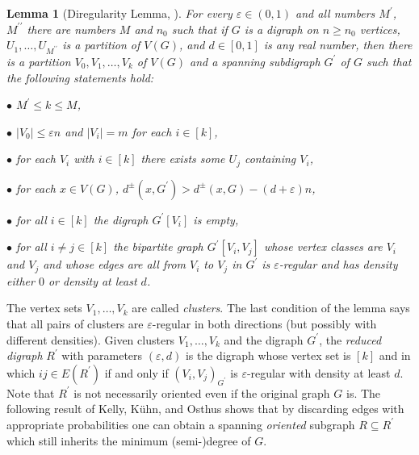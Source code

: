 \documentclass[11pt,a4paper,reqno]{amsart}
\newtheorem{lemma}[theorem]{Lemma}
\theoremstyle{definition} %
\begin{document}
\begin{lemma}[Diregularity Lemma, \cite{keevashJLMS79}]
		\label{LEM:reguler}
		For every $\varepsilon \in (0,1)$ and all numbers $M^{\prime}$, $M^{\prime\prime}$ there are numbers $M$ and $n_0$ such that if $G$ is a digraph on $n \geqslant  n_0$ vertices, $U_1,\ldots,U_{M^{\prime\prime}}$ is a partition of $V(G)$, and $d \in [0,1]$ is any real number, then there is a partition $V_0,V_1,\ldots,V_k$ 
		of $V(G)$ and a spanning subdigraph $G^\prime$ of $G$ such that the following statements hold:
		
		$\bullet$ $M^{\prime}\leqslant  k \leqslant  M$,
		
		$\bullet$ $|V_0| \leqslant  \varepsilon n$ and $|V_i|=m$ for each $i\in[k]$,
		
		$\bullet$ for each $V_i$ with $i\in[k]$ there exists some $U_j$ containing $V_i$,
		
		$\bullet$  for each $x \in V(G)$, $d^\pm(x,G^{\prime}) > d^\pm(x,G) - (d+\varepsilon)n$,
		
		$\bullet$ for all $i\in[k]$ the digraph $G^{\prime}[V_i]$ is empty,
		
		$\bullet$ for all $i\neq j\in[k]$ the bipartite graph $G^{\prime}[V_i,V_j]$ whose vertex classes are $V_i$ and $V_j$ and whose edges are all from $V_i$ to $V_j$ in $G^{\prime}$ is $\varepsilon$-regular and has density either $0$ or density at least $d$.
	\end{lemma}


The vertex sets $V_1,\ldots,V_k$ are called \emph{clusters}. 
The last condition of the lemma says that all pairs of clusters are $\varepsilon$-regular in both directions (but possibly with different densities).
Given clusters $V_1,\ldots,V_k$ and the  digraph $G^{\prime}$, the \emph{reduced digraph} $R^{\prime}$ with parameters $(\varepsilon, d)$ is the digraph
whose vertex set is $[k]$ and in which $ij\in E(R^{\prime})$ if and only if $(V_i, V_j)_{G^{\prime}}$ is $\varepsilon$-regular with density at least $d$.  Note that  $R^{\prime}$ is not necessarily oriented even if the original graph $G$ is. 
The following result of Kelly, K\"{u}hn, and Osthus shows that by discarding edges with appropriate probabilities one can obtain a spanning \emph{oriented} subgraph $R\subseteq R^{\prime}$ which still inherits the minimum (semi-)degree of $G$.
\end{document}
